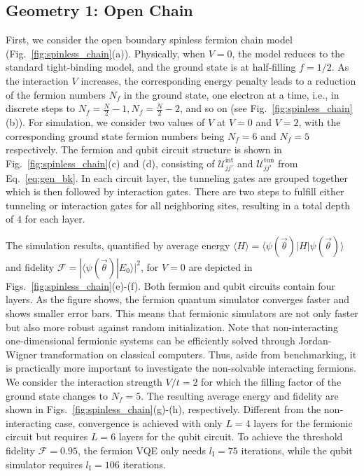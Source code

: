 \documentclass[aps, prx, reprint, superscriptaddress]{revtex4-2}
\begin{document}
\subsection{Geometry 1: Open Chain}
\label{subsec:spinless_open_chain}
First, we consider the open boundary spinless fermion chain model (Fig.~\ref{fig:spinless_chain}(a)).  Physically, when $V{=}0$, the model reduces to the standard tight-binding model, and the ground state is at half-filling $f{=}1/2$. As the interaction $V$ increases, the corresponding energy penalty leads to a reduction of the fermion numbers $N_f$ in the ground state, one electron at a time, i.e., in discrete steps to $N_f{=}\frac{N}{2} -1, N_f{=}\frac{N}{2} {-}2$, and so on (see Fig.~\ref{fig:spinless_chain}(b)). For simulation, we consider two values of $V$ at $V{=}0$ and $V{=}2$, with the corresponding ground state fermion numbers being $N_f{=}6$ and $N_f{=}5$ respectively. 
The fermion and qubit circuit structure is shown in Fig.~\ref{fig:spinless_chain}(c) and (d), consisting of $\mathcal{U}^{\text{int}}_{jj'}$ and $\mathcal{U}^{\text{tun}}_{jj'}$ from Eq.~\eqref{eq:gen_bk}. 
In each circuit layer, the tunneling gates are grouped together which is then followed by interaction gates. 
There are two steps to fulfill either tunneling or interaction gates for all neighboring sites, resulting in a total depth of $4$ for each layer.



The simulation results, quantified by average energy $\langle H\rangle {=}\langle\psi(\vec{\theta})|H|\psi(\vec{\theta})\rangle$ and fidelity $\mathcal{F}{=}|\langle \psi(\vec{\theta})|E_0\rangle|^2$, for $V{=}0$ are depicted in Figs.~\ref{fig:spinless_chain}(e)-(f). 
Both fermion and qubit circuits contain four layers. As the figure shows, the fermion quantum simulator converges faster and shows smaller error bars. This means that fermionic simulators are not only faster but also more robust against random initialization. Note that non-interacting one-dimensional fermionic systems can be efficiently solved through Jordan-Wigner transformation on classical computers. Thus, aside from benchmarking, it is practically more important to investigate the non-solvable interacting fermions. We consider the interaction strength $V/t{=}2$ for which the filling factor of the ground state changes to $N_f{=}5$. 
The resulting average energy and fidelity are shown in  Figs.~\ref{fig:spinless_chain}(g)-(h), respectively. 
 Different from the non-interacting case, convergence is achieved with only $L{=}4$ layers for the fermionic circuit but requires $L{=}6$ layers for the qubit circuit. To achieve the threshold fidelity $\mathcal{F}{=}0.95$, the fermion VQE only needs $l_\text{I}{=}75$ iterations, while the qubit simulator requires $l_\text{I}{=}106$ iterations. 
\end{document}
